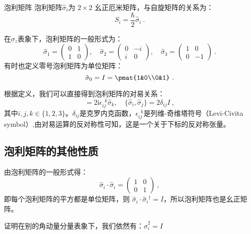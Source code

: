 



\begin{definition}{泡利矩阵}\label{def_pauliM_1}
泡利矩阵$\hat{\sigma}_i$为 $2\times 2$ 幺正厄米矩阵，与自旋矩阵的关系为：
\begin{equation}
S_i=\frac{\hbar}{2}\hat{\sigma}_i~.
\end{equation}
\end{definition}
在$\hat{\sigma}_z$表象下，泡利矩阵的一般形式为：
\begin{equation}
\hat{\sigma}_1 = \begin{pmatrix}
0 & 1\\
1 & 0
\end{pmatrix},\quad 
\hat{\sigma}_2 = \begin{pmatrix}
0 & -i\\
i & 0
\end{pmatrix},\quad 
\hat{\sigma}_3 = 
\begin{pmatrix}
1 & 0\\
0 & -1
\end{pmatrix}
~.
\end{equation}
有时也定义零号泡利矩阵为单位矩阵：
\begin{equation}
\hat{\sigma}_0 = I=\pmat{1&0\\0&1}~.
\end{equation}

根据定义，我们可以直接得到泡利矩阵的对易关系：
\begin{equation}
[\hat{\sigma}_i,\hat{\sigma}_j]=2\mathrm {i}\epsilon ^{\,\,\, k}_{ij}\hat{\sigma}_k,\quad\{\hat{\sigma}_i,\hat{\sigma}_j\}=2\delta_{ij}I~,
\end{equation}
其中$i,j,k\in\{1,2,3\}$。$\delta_{ij}$是克罗内克函数，$\epsilon ^{\,\,\, k}_{ij}$是列维-奇维塔符号（Levi-Civita symbol）,由对易运算的反对称性可知，这是一个关于下标的反对称张量。

\subsection{泡利矩阵的其他性质}
由泡利矩阵的一般形式得：
\begin{equation}
\hat{\sigma}_i\cdot \hat{\sigma}_i = \begin{pmatrix}1&0\\0&1\end{pmatrix}~,
\end{equation}
即每个泡利矩阵的平方都是单位矩阵，则 $\hat{\sigma}_i \cdot  \hat{\sigma}_i{}^\dagger = I$，所以泡利矩阵也是幺正矩阵。
\begin{exercise}{}
证明在别的角动量分量表象下，我们依然有：$\hat{\sigma}_i^2=I$
\end{exercise}

